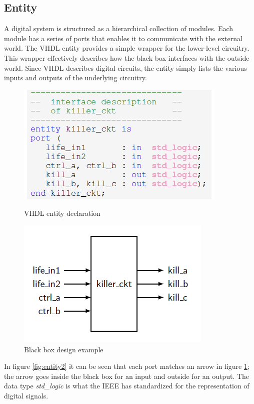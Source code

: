 \subsection{Entity}
\noindent A digital system is structured as a hierarchical collection of modules. Each module has a series of ports that enables it to communicate with the external world. The VHDL entity provides a simple wrapper for the lower-level circuitry.
This wrapper effectively describes how the black box interfaces with the outside world. Since VHDL describes digital circuits, the entity simply lists the various inputs and outputs of the underlying circuitry.
\begin{figure}
	\centering
	\begin{minipage}{.5\textwidth}
		\centering
		\includegraphics[width=.7\linewidth]{IMG/ch3/ENTITY2}
		\caption{VHDL entity declaration}
		\label{fig:entity2}
	\end{minipage}%
	\begin{minipage}{.5\textwidth}
		\centering
		\includegraphics[width=.62\linewidth]{IMG/ch3/ENTITY1}
		\caption{Black box design example}
		\label{fig:entity1}
	\end{minipage}
\end{figure}
\noindent In figure \ref{fig:entity2} it can be seen that each port matches an arrow in figure \ref{fig:entity1}; the arrow goes inside the black box for an input and outside for an output. The data type \textit{std\_logic} is what the IEEE has standardized for the representation of digital signals. 

